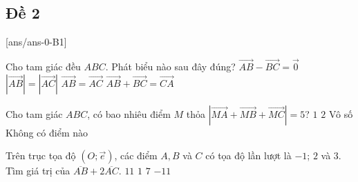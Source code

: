 \newpage 
\subsection{Đề 2}

[ans/ans-0-B1]
\caulc
\begin{ex}%
	Cho tam giác đều $ABC$. Phát biểu nào sau đây đúng?
	\choice
	{$\overrightarrow{AB}-\overrightarrow{BC}=\overrightarrow0$}
	{\True $\left|\overrightarrow{AB}\right|=\left|\overrightarrow{AC}\right|$}
	{$\overrightarrow{AB}=\overrightarrow{AC}$}
	{$\overrightarrow{AB}+\overrightarrow{BC}=\overrightarrow{CA}$}
\end{ex}
\begin{ex}%
	Cho tam giác $ABC$, có bao nhiêu điểm $M$ thỏa $\left|\overrightarrow{MA}+\overrightarrow{MB}+\overrightarrow{MC}\right|=5$?
	\choice
	{$1$}
	{$2$}
	{\True Vô số}
	{Không có điểm nào}
\end{ex}
\begin{ex}%
	Trên trục tọa độ $\left(O; \overrightarrow{e}\right)$, các điểm $A, B$ và $C$ có tọa độ lần lượt là $-1$; $2$ và $3$. Tìm giá trị của $\overline{AB}+2\overline{AC}$.
	\choice
	{\True $11$}
	{$1$}
	{$7$}
	{$-11$}
	\loigiai{
		\[\overline{AB}=2-\left(-1\right)=3, \overline{AC}=3-\left(-1\right)=4\Rightarrow \overline{AB}+2\overline{AC}=3+2\cdot4=11.
		\]
	}
\end{ex}

